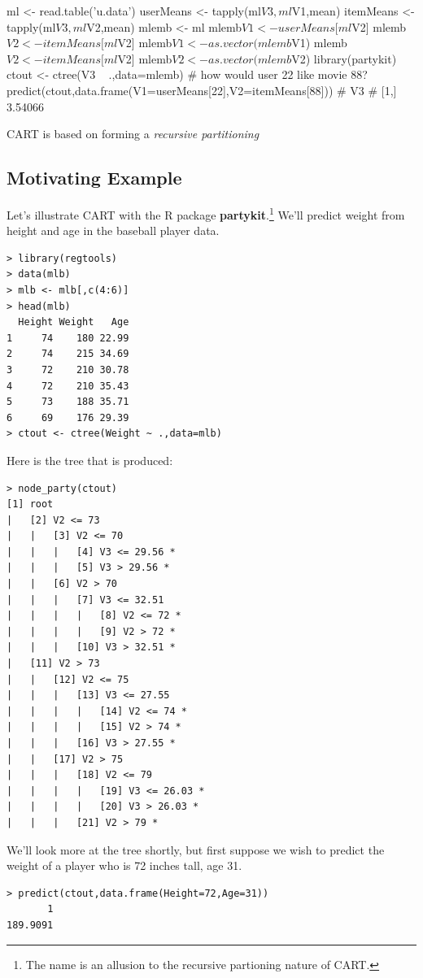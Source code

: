 ml <- read.table('u.data')
userMeans <- tapply(ml$V3,ml$V1,mean)
itemMeans <- tapply(ml$V3,ml$V2,mean)
mlemb <- ml
mlemb$V1 <- userMeans[ml$V2]
mlemb$V2 <- itemMeans[ml$V2]
mlemb$V1 <- as.vector(mlemb$V1)
mlemb$V2 <- itemMeans[ml$V2]
mlemb$V2 <- as.vector(mlemb$V2)
library(partykit)
ctout <- ctree(V3 ~ .,data=mlemb)
# how would user 22 like movie 88?
predict(ctout,data.frame(V1=userMeans[22],V2=itemMeans[88]))
#            V3
# [1,] 3.54066 

\fi

CART is based on forming a \textit{recursive partitioning}

\subsection{Motivating Example}

Let's illustrate CART with the R package \textbf{partykit}.\footnote{The
name is an allusion to the recursive partioning nature of CART.}  We'll
predict weight from height and age in the baseball player data.

\begin{lstlisting}
> library(regtools) 
> data(mlb) 
> mlb <- mlb[,c(4:6)] 
> head(mlb)
  Height Weight   Age
1     74    180 22.99
2     74    215 34.69
3     72    210 30.78
4     72    210 35.43
5     73    188 35.71
6     69    176 29.39
> ctout <- ctree(Weight ~ .,data=mlb) 
\end{lstlisting}

Here is the tree that is produced:

\begin{lstlisting}
> node_party(ctout) 
[1] root
|   [2] V2 <= 73
|   |   [3] V2 <= 70
|   |   |   [4] V3 <= 29.56 *
|   |   |   [5] V3 > 29.56 *
|   |   [6] V2 > 70
|   |   |   [7] V3 <= 32.51
|   |   |   |   [8] V2 <= 72 *
|   |   |   |   [9] V2 > 72 *
|   |   |   [10] V3 > 32.51 *
|   [11] V2 > 73
|   |   [12] V2 <= 75
|   |   |   [13] V3 <= 27.55
|   |   |   |   [14] V2 <= 74 *
|   |   |   |   [15] V2 > 74 *
|   |   |   [16] V3 > 27.55 *
|   |   [17] V2 > 75
|   |   |   [18] V2 <= 79
|   |   |   |   [19] V3 <= 26.03 *
|   |   |   |   [20] V3 > 26.03 *
|   |   |   [21] V2 > 79 *
\end{lstlisting}

We'll look more at the tree shortly, but first suppose we wish to
predict the weight of a player who is 72 inches tall, age 31.

\begin{lstlisting}
> predict(ctout,data.frame(Height=72,Age=31))
       1 
189.9091 
\end{lstlisting}

